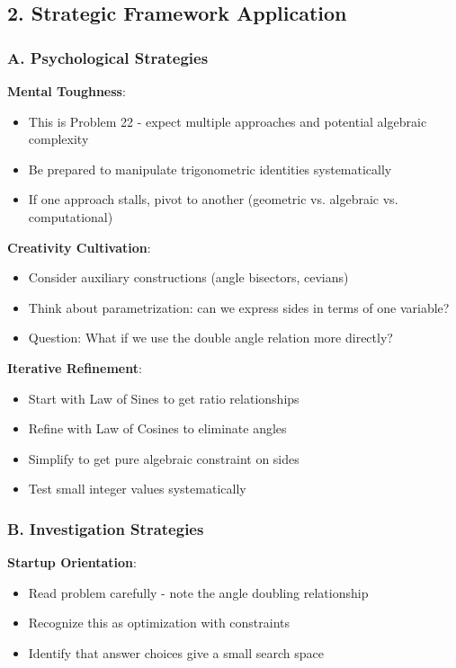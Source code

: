 \documentclass[12pt]{article}
\begin{document}
\begin{strategicbox}
\subsection*{2. Strategic Framework Application}

\subsubsection*{A. Psychological Strategies}

\textbf{Mental Toughness}:
\begin{itemize}
    \item This is Problem 22 - expect multiple approaches and potential algebraic complexity
    \item Be prepared to manipulate trigonometric identities systematically
    \item If one approach stalls, pivot to another (geometric vs. algebraic vs. computational)
\end{itemize}

\textbf{Creativity Cultivation}:
\begin{itemize}
    \item Consider auxiliary constructions (angle bisectors, cevians)
    \item Think about parametrization: can we express sides in terms of one variable?
    \item Question: What if we use the double angle relation more directly?
\end{itemize}

\textbf{Iterative Refinement}:
\begin{itemize}
    \item Start with Law of Sines to get ratio relationships
    \item Refine with Law of Cosines to eliminate angles
    \item Simplify to get pure algebraic constraint on sides
    \item Test small integer values systematically
\end{itemize}

\subsubsection*{B. Investigation Strategies}

\textbf{Startup Orientation}:
\begin{itemize}
    \item Read problem carefully - note the angle doubling relationship
    \item Recognize this as optimization with constraints
    \item Identify that answer choices give a small search space
\end{itemize}


\end{strategicbox}
\end{document}
